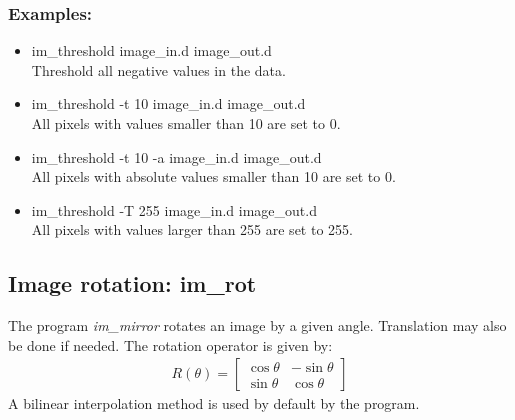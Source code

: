 \subsubsection*{Examples:}
\begin{itemize}
\item im\_threshold  image\_in.d image\_out.d \\
Threshold all negative values in the data.
\item im\_threshold  -t 10 image\_in.d image\_out.d \\
All pixels with values smaller than 10 are set to 0.
\item im\_threshold  -t 10 -a image\_in.d image\_out.d \\
All pixels with absolute values smaller than 10 are set to 0.
\item im\_threshold  -T 255 image\_in.d image\_out.d \\
All pixels with values larger than 255 are set to 255.
\end{itemize}

\subsection{Image rotation: im\_rot}

The program {\em im\_mirror} rotates an image by a given angle.
Translation may also be done if needed. 
The rotation operator is given by:
\begin{eqnarray}
R(\theta) = 
\left[\begin{array}{cc}
               \cos \theta &  - \sin \theta  \\
               \sin \theta  & \cos \theta   
       \end{array}
\right]   
\end{eqnarray}
A bilinear interpolation method is used by default by the program.

